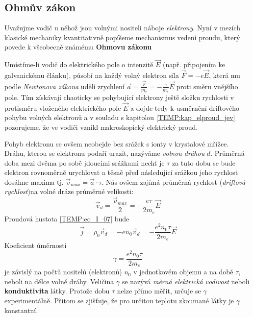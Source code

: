 {    %
    \subsection{Ohmův zákon}
      Uvažujme vodič u něhož jsou volnými nositeli náboje \emph{elektrony}. Nyní v mezích klasické
      mechaniky kvantitativně popíšeme mechanismus vedení proudu, který povede k všeobecně známému
      \textbf{Ohmovu zákonu}
      
      Umístíme-li vodič do elektrického pole o intenzitě $\vec{E}$ (např. připojením ke
      galvanickému článku), působí na každý volný elektron síla $\vec{F} = -e\vec{E}$, která mu
      podle \emph{Newtonova zákona} udělí zrychlení $\vec{a} = \frac{\vec{F}}{m_e} = -
      \frac{e}{m_e}\vec{E}$ proti směru vnějšího pole. Tím získávají chaoticky se pohybující
      elektrony ještě složku rychlosti v protisměru vloženého elektrického pole $\vec{E}$ a  dojde
      tedy k usměrnění driftového pohybu volných elektronů a v souladu s kapitolou
      \ref{TEMP:kap_elproud_jev} pozorujeme, že ve vodiči vznikl makroskopický elektrický proud.
      
      Pohyb elektronu se ovšem neobejde bez srážek s ionty v krystalové mřížce. Dráhu, kterou se
      elektronu podaří urazit, nazýváme \emph{volnou dráhou} $d$. Průměrná doba mezi dvěma po sobě
      jdoucími srážkami nechť je $\tau$ za tuto dobu se bude elektron rovnoměrně urychlovat a těsně
      před následující srážkou jeho rychlost dosáhne maxima tj. $\vec{v}_{max} = \vec{a}\cdot\tau$.
      Nás ovšem zajímá průměrná rychlost (\emph{driftová rychlost})na volné dráze průměrné
      velikosti:
      \begin{equation}\label{TEMP:eq_vd_01}
        \vec{v}_d = \frac{\vec{v}_{max}}{2} = -\frac{e\tau}{2m_e}\vec{E}
      \end{equation}   
      Proudová hustota \ref{TEMP:eq_I_07} bude
      \begin{equation}\label{TEMP:eq_j_02}
        \vec{j} = \rho_0\vec{v}_d= -en_0\vec{v}_d = -\frac{e^2n_0\tau}{2m_e}\vec{E}
      \end{equation}       
      Koeficient úměrnosti 
      \begin{equation}\label{TEMP:eq_g_03}
        \gamma = \frac{e^2n_0\tau}{2m_e}
      \end{equation}     
      je závislý na počtů nositelů (elektronů) $n_0$ v jednotkovém objemu a na době $\tau$, neboli
      na délce volné dráhy. Veličina $\gamma$ se nazývá \emph{měrná elektrická vodivost} neboli
      \textbf{konduktivita} látky. Protože dobu $\tau$ nelze přímo měřit, určuje se $\gamma$
      experimentálně. Přitom se zjišťuje, že pro určitou teplotu zkoumané látky je $\gamma$
      konstantní.
      
}
